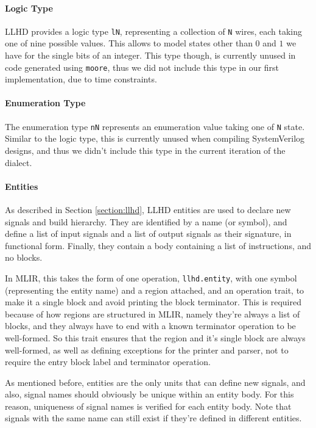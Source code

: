 \paragraph{Logic Type}
LLHD provides a logic type \texttt{lN}, representing a collection of \texttt{N} wires, each taking one of nine possible values. This allows to model states other than $0$ and $1$ we have for the single bits of an integer. This type though, is currently unused in code generated using \texttt{moore}, thus we did not include this type in our first implementation, due to time constraints.

\paragraph{Enumeration Type}
The enumeration type \texttt{nN} represents an enumeration value taking one of \texttt{N} state. Similar to the logic type, this is currently unused when compiling SystemVerilog designs, and thus we didn't include this type in the current iteration of the dialect.

\paragraph{Entities}
As described in Section \ref{section:llhd}, LLHD entities are used to declare new signals and build hierarchy. They are identified by a name (or symbol), and define a list of input signals and a list of output signals as their signature, in functional form. Finally, they contain a body containing a list of instructions, and no blocks.

In MLIR, this takes the form of one operation, \texttt{llhd.entity}, with one symbol (representing the entity name) and a region attached, and an operation trait, to make it a single block and avoid printing the block terminator. This is required because of how regions are structured in MLIR, namely they're always a list of blocks, and they always have to end with a known terminator operation to be well-formed. So this trait ensures that the region and it's single block are always well-formed, as well as defining exceptions for the printer and parser, not to require the entry block label and terminator operation.

As mentioned before, entities are the only units that can define new signals, and also, signal names should obviously be unique within an entity body. For this reason, uniqueness of signal names is verified for each entity body. Note that signals with the same name can still exist if they're defined in different entities.

